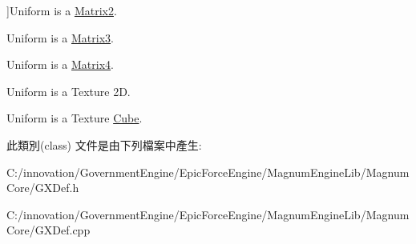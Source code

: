 \begin{Desc}
\begin{description}
{}]Uniform is a \hyperlink{class_i_dream_sky_1_1_matrix2}{Matrix2}. \item[{\em 
M\+A\+T3\hypertarget{class_i_dream_sky_1_1_g_x_shader_uniform_type_ae17ebbaaa2f0bc41b101334f3d6ba7d3a78220f8ff566cb06d220bd59dcc3b5f2}{}\label{class_i_dream_sky_1_1_g_x_shader_uniform_type_ae17ebbaaa2f0bc41b101334f3d6ba7d3a78220f8ff566cb06d220bd59dcc3b5f2}
}]Uniform is a \hyperlink{class_i_dream_sky_1_1_matrix3}{Matrix3}. \item[{\em 
M\+A\+T4\hypertarget{class_i_dream_sky_1_1_g_x_shader_uniform_type_ae17ebbaaa2f0bc41b101334f3d6ba7d3a7718058ee41821e83c17aef4c204fe20}{}\label{class_i_dream_sky_1_1_g_x_shader_uniform_type_ae17ebbaaa2f0bc41b101334f3d6ba7d3a7718058ee41821e83c17aef4c204fe20}
}]Uniform is a \hyperlink{class_i_dream_sky_1_1_matrix4}{Matrix4}. \item[{\em 
S\+A\+M\+P\+L\+E\+R2D\hypertarget{class_i_dream_sky_1_1_g_x_shader_uniform_type_ae17ebbaaa2f0bc41b101334f3d6ba7d3a07646b2cf0d5f461e563ca7ca48ba35c}{}\label{class_i_dream_sky_1_1_g_x_shader_uniform_type_ae17ebbaaa2f0bc41b101334f3d6ba7d3a07646b2cf0d5f461e563ca7ca48ba35c}
}]Uniform is a Texture 2D. \item[{\em 
S\+A\+M\+P\+L\+E\+R\+C\+U\+BE\hypertarget{class_i_dream_sky_1_1_g_x_shader_uniform_type_ae17ebbaaa2f0bc41b101334f3d6ba7d3abe68f618d003e770e2b63715c5647d2f}{}\label{class_i_dream_sky_1_1_g_x_shader_uniform_type_ae17ebbaaa2f0bc41b101334f3d6ba7d3abe68f618d003e770e2b63715c5647d2f}
}]Uniform is a Texture \hyperlink{class_i_dream_sky_1_1_cube}{Cube}. \end{description}
\end{Desc}


此類別(class) 文件是由下列檔案中產生\+:\begin{DoxyCompactItemize}
\item 
C\+:/innovation/\+Government\+Engine/\+Epic\+Force\+Engine/\+Magnum\+Engine\+Lib/\+Magnum\+Core/G\+X\+Def.\+h\item 
C\+:/innovation/\+Government\+Engine/\+Epic\+Force\+Engine/\+Magnum\+Engine\+Lib/\+Magnum\+Core/G\+X\+Def.\+cpp\end{DoxyCompactItemize}
